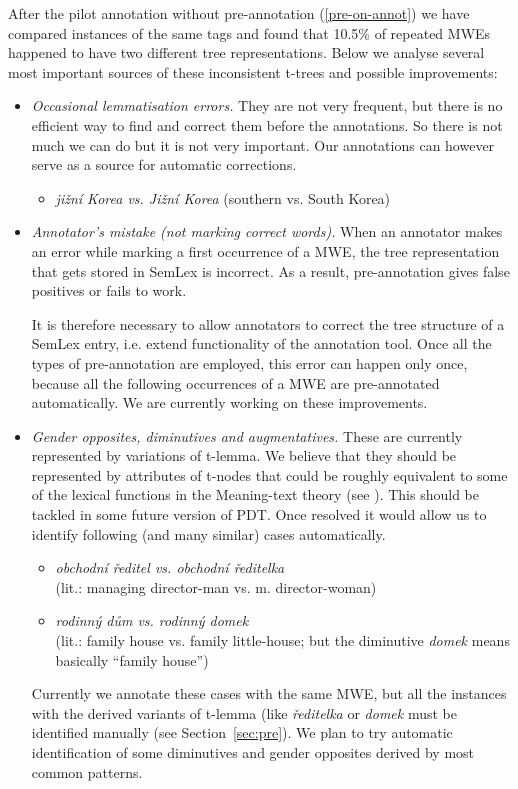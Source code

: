 After the pilot annotation without pre-annotation (\ref{pre-on-annot})  we have compared instances of the same tags and found that 10.5\% of repeated MWEs happened to have two different tree representations. Below we analyse several most important sources of these inconsistent t-trees and possible improvements:
\begin{itemize}
%
\item {\em Occasional lemmatisation errors.} They are not very frequent, but there is no efficient way to find and correct them before the annotations. So there is not much we can do but it is not very important. Our annotations can however serve as a source for automatic corrections.
	\begin{itemize}
	\item \textit{jižní Korea {\rm vs.} Jižní Korea} (southern vs. South Korea)
	\end{itemize}
\item {\em Annotator's mistake (not marking correct words).} When an annotator makes an error while marking a first occurrence of a MWE, the tree representation that gets stored in SemLex is incorrect. As a result, pre-annotation gives false positives or fails to work. 

It is therefore necessary to allow annotators to correct the tree structure of a SemLex entry, i.e. extend functionality of the annotation tool. Once all the types of pre-annotation are employed, this error can happen only once, because all the following occurrences of a MWE are pre-annotated automatically. We are currently working on these improvements.
%
\item {\em Gender opposites, diminutives and augmentatives.} These are currently represented by variations of t-lemma. 
We believe that they should be represented by attributes of t-nodes %
that could be roughly equivalent to some of the lexical functions in the Meaning-text theory (see \cite{melcuk:1992}).
This should be tackled in some future version of PDT. Once resolved it would allow us to identify following (and many similar) cases automatically. 
	\begin{itemize}
	\item \textit{obchodní ředitel {\rm vs.} obchodní ředitelka} \\(lit.: managing director-man vs. m. director-woman)
	\item \textit{rodinný dům {\rm vs.} rodinný domek} \\(lit.: family house vs. family little-house; but the diminutive {\em domek} means basically “family house”)
	\end{itemize}
%
Currently we annotate these cases with the same MWE, but all the instances with the derived variants of t-lemma (like {\em ředitelka } or {\em domek} must be identified manually (see Section~\ref{sec:pre}). We plan to try automatic identification of some diminutives and gender opposites derived by most common patterns.


\end{itemize}
